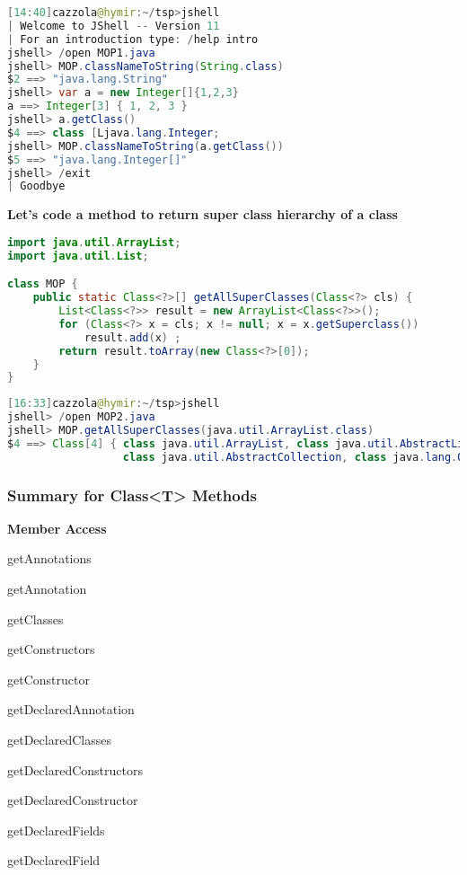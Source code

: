 \begin{lstlisting}[language=Java]
[14:40]cazzola@hymir:~/tsp>jshell
| Welcome to JShell -- Version 11
| For an introduction type: /help intro
jshell> /open MOP1.java
jshell> MOP.classNameToString(String.class)
$2 ==> "java.lang.String"
jshell> var a = new Integer[]{1,2,3}
a ==> Integer[3] { 1, 2, 3 }
jshell> a.getClass()
$4 ==> class [Ljava.lang.Integer;
jshell> MOP.classNameToString(a.getClass())
$5 ==> "java.lang.Integer[]"
jshell> /exit
| Goodbye
\end{lstlisting}

\textbf{Let’s code a method to return super class hierarchy of a class}

\begin{lstlisting}[language=Java]
import java.util.ArrayList;
import java.util.List;

class MOP {
	public static Class<?>[] getAllSuperClasses(Class<?> cls) {
		List<Class<?>> result = new ArrayList<Class<?>>();
		for (Class<?> x = cls; x != null; x = x.getSuperclass())
			result.add(x) ;
		return result.toArray(new Class<?>[0]);
	}
}
\end{lstlisting}

\begin{lstlisting}[language=Java]
[16:33]cazzola@hymir:~/tsp>jshell
jshell> /open MOP2.java
jshell> MOP.getAllSuperClasses(java.util.ArrayList.class)
$4 ==> Class[4] { class java.util.ArrayList, class java.util.AbstractList,
                  class java.util.AbstractCollection, class java.lang.Object }
\end{lstlisting}

\subsubsection{Summary for Class<T> Methods}

\textbf{Member Access}

getAnnotations

getAnnotation

getClasses

getConstructors

getConstructor

getDeclaredAnnotation

getDeclaredClasses

getDeclaredConstructors

getDeclaredConstructor

getDeclaredFields

getDeclaredField

